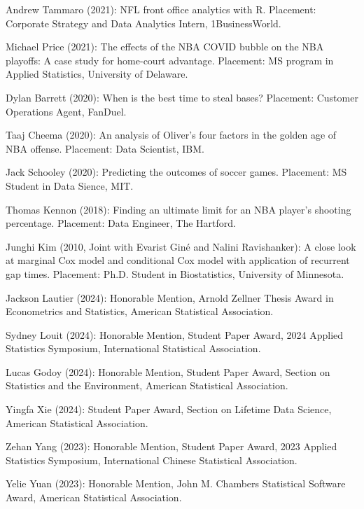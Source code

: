 \documentclass[Statistics]{vita}
\begin{document}
\begin{vita}
\begin{Students}
\begin{UndergraduateHonor}
    \item Andrew Tammaro (2021): NFL front office analytics with R. Placement: Corporate Strategy and Data Analytics Intern, 1BusinessWorld.
    \item Michael Price (2021): The effects of the NBA COVID bubble on the NBA playoffs: A case study for home-court advantage. Placement: MS program in Applied Statistics, University of Delaware.
    \item Dylan Barrett (2020): When is the best time to steal bases? Placement: Customer Operations Agent, FanDuel.
    \item Taaj Cheema (2020): An analysis of Oliver’s four factors in the golden age of NBA offense. Placement: Data Scientist, IBM.
    \item Jack Schooley (2020): Predicting the outcomes of soccer games. Placement: MS Student in Data Sience, MIT.
    \item Thomas Kennon (2018): Finding an ultimate limit for an NBA player's shooting percentage. Placement: Data Engineer, The Hartford.
    \item Junghi Kim (2010, Joint with Evarist Gin\'e and Nalini Ravishanker): A close look at marginal Cox model and conditional Cox model with application of recurrent gap times. Placement: Ph.D. Student in Biostatistics, University of Minnesota.
    \end{UndergraduateHonor}
  \end{Students}
  \begin{TeachingAccomplishments}
    \begin{StudentAwards}
    \item Jackson Lautier (2024): Honorable Mention, Arnold Zellner Thesis Award in Econometrics and Statistics, American Statistical Association.
    \item Sydney Louit (2024): Honorable Mention, Student Paper Award, 2024 Applied Statistics Symposium, International Statistical Association.
    \item Lucas Godoy (2024): Honorable Mention, Student Paper Award, Section on Statistics and the Environment, American Statistical Association.
    \item Yingfa Xie (2024): Student Paper Award, Section on Lifetime Data Science, American Statistical Association.
    \item Zehan Yang (2023): Honorable Mention, Student Paper Award, 2023 Applied Statistics Symposium, International Chinese Statistical Association.
    \item Yelie Yuan (2023): Honorable Mention, John M. Chambers Statistical Software Award, American Statistical Association.

\end{StudentAwards}
\end{TeachingAccomplishments}
\end{vita}
\end{document}
